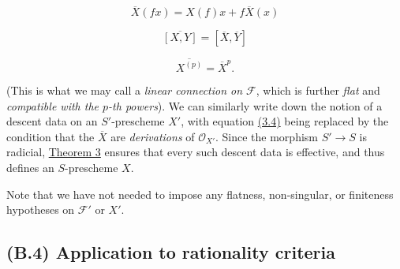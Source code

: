 \documentclass{article}
\newcommand{\oldpage}[1]{\marginpar{\footnotesize$\Big\vert$ \textit{p.~#1}}}
\theoremstyle{definition}
\theoremstyle{definition}
\theoremstyle{definition}
\theoremstyle{definition}
\theoremstyle{remark}
\begin{document}
\leavevmode{}%
\[
  \overline{X}(fx) = X(f)x + f\overline{X}(x)
\tag{3.8}
\]

\leavevmode{}%
\[
  \overline{[X,Y]} = [\overline{X},\overline{Y}]
\tag{3.9}
\]

\leavevmode{}%
\[
  \overline{X^{(p)}} = \overline{X}^p.
\tag{3.10}
\]

(This is what we may call a \emph{linear connection on \({\mathcal{F}}\)}, which is further \emph{flat} and \emph{compatible with the \(p\)-th powers}).
We can similarly write down the notion of a descent data on an \(S'\)-prescheme \(X'\), with equation \protect\hyperlink{fga-3-i-section-B.3-equation-3.4}{(3.4)} being replaced by the condition that the \(\overline{X}\) are \emph{derivations} of \({\mathscr{O}}_{X'}\).
\oldpage{190-24}Since the morphism \(S'\to S\) is radicial, \protect\hyperlink{fga-3-i-section-B.1-theorem-3}{Theorem 3} ensures that every such descent data is effective, and thus defines an \(S\)-prescheme \(X\).

Note that we have not needed to impose any flatness, non-singular, or finiteness hypotheses on \({\mathcal{F}}'\) or \(X'\).

\hypertarget{fga-3-i-section-B.4}{%
\subsection{(B.4) Application to rationality criteria}\label{fga-3-i-section-B.4}}
\end{document}
